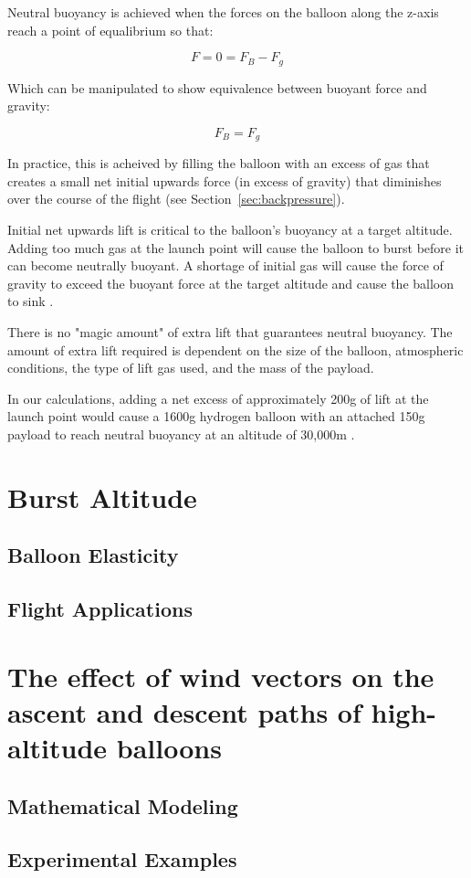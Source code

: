 \documentclass[usenatbib]{mn2e}
\begin{document}
Neutral buoyancy is achieved when the forces on the balloon along the z-axis reach a point of equalibrium so that:

\begin{equation}
	F = 0 = F_B - F_g
\end{equation}

Which can be manipulated to show equivalence between buoyant force and gravity:

\begin{equation}
	F_B = F_g
\end{equation}

In practice, this is acheived by filling the balloon with an excess of gas that creates a small net initial upwards force (in excess of gravity) that diminishes over the course of the flight (see Section~\ref{sec:backpressure}).

Initial net upwards lift is critical to the balloon's buoyancy at a target altitude. Adding too much gas at the launch point will cause the balloon to burst before it can become neutrally buoyant. A shortage of initial gas will cause the force of gravity to exceed the buoyant force at the target altitude and cause the balloon to sink \citep{sciballooning}.

There is no "magic amount" of extra lift that guarantees neutral buoyancy. The amount of extra lift required is dependent on the size of the balloon, atmospheric conditions, the type of lift gas used, and the mass of the payload.

In our calculations, adding a net excess of approximately 200g of lift at the launch point would cause a 1600g hydrogen balloon with an attached 150g payload to reach neutral buoyancy at an altitude of 30,000m \citep{crchandbook}.

\section{Burst Altitude}

\subsection{Balloon Elasticity}

\subsection{Flight Applications}

\section{The effect of wind vectors on the ascent and descent paths of high-altitude balloons}

\subsection{Mathematical Modeling}

\subsection{Experimental Examples}

\label{lastpage}


\end{document}
